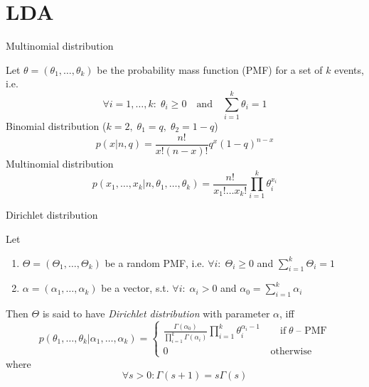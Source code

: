 \documentclass[aspectratio=1610]{beamer}
\begin{document}
\section{LDA}

\begin{frame}{Multinomial distribution}

Let $\theta = (\theta_1, \ldots, \theta_k)$ be the probability mass function (PMF) for a set of $k$ events, i.e.
\[
\forall i = 1, \ldots, k: \; \theta_i \geqslant 0 \quad \text{and} \quad \sum_{i=1}^k \theta_i = 1
\]
Binomial distribution ($k = 2, \; \theta_1 = q, \; \theta_2 = 1- q$)
\[
p(x | n , q) = \frac{n!}{x! (n-x)!} q^{x} (1 - q)^{n-x}
\]
Multinomial distribution
\[
p(x_1, \ldots, x_k | n, \theta_1, \ldots, \theta_k) = \frac{n!}{x_1! \ldots x_k!} \prod_{i=1}^k \theta_i^{x_i}
\]

\end{frame}

\begin{frame}{Dirichlet distribution}

Let
\begin{enumerate}
\item $\Theta = (\Theta_1, \ldots, \Theta_k)$ be a random PMF, i.e. $ \forall i: \; \Theta_i \geqslant 0 $ and $\sum_{i=1}^k \Theta_i = 1$
\item $\alpha = (\alpha_1, \ldots, \alpha_k)$ be a vector, s.t. $\forall i: \; \alpha_i > 0$ and $\alpha_0 = \sum_{i=1}^k \alpha_i$
\end{enumerate}

{Then $\Theta$ is said to have {\it Dirichlet distribution} with parameter $\alpha$, iff}
\[
p(\theta_1, \ldots, \theta_k | \alpha_1, \ldots, \alpha_k) = \begin{cases}
\frac{\Gamma(\alpha_0)}{\prod_{i=1}^k \Gamma(\alpha_i)} \prod_{i=1}^k \theta_i^{\alpha_i - 1} \qquad \text{if} \;\theta\; \text{-- PMF} \\
0  \;\qquad\qquad\qquad\qquad\qquad\text{otherwise}
\end{cases}
\]
where
\[
\forall s > 0: \Gamma(s + 1) = s \Gamma(s)
\]

\end{frame}
\end{document}
